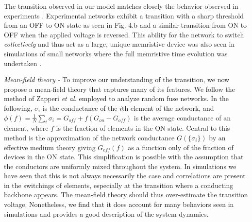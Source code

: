 \documentclass[aps,prl,reprint,groupedaddress]{revtex4-1}
\begin{document}
The transition observed in our model 
matches closely the behavior observed  in experiments .  Experimental networks exhibit a transition with a sharp
threshold from an OFF to ON state as seen in  \cite{Stieg2014} Fig. 4.b and a
similar transition from ON to OFF when the applied voltage is reversed.
This ability for the network to switch {\it collectively} and thus act as a large, unique 
memristive device was also seen in simulations of small networks where the full memristive time
evolution was undertaken \cite{NedaaeeOskoee2011, Sillin2014}.

{\it Mean-field theory -}  To improve our understanding of the transition, we now
propose a mean-field theory that captures many of its features. We follow the method of Zapperi {\it et al.}
\cite{Zapperi1999} employed to analyze random fuse networks.  In the following,
$\sigma_i$ is the conductance of the $i$th element of the network,
and \(\phi(f) = \frac{1}{N}\sum_i \sigma_i = G_{off} + f (G_{on} - G_{off})\)
is the average conductance of an element, where $f$ is the fraction of elements
in the ON state. Central to this method is the approximation of the network
conductance $G(\{\sigma_i\})$ by an effective medium theory giving $G_{eff}(f)$
as a function only of the fraction of devices in the ON state.  This
simplification is possible with the assumption that the conductors are
uniformly mixed throughout the system. In simulations we have seen
that this is not always necessarily the case and correlations are present in the switchings of
elements, especially at the transition where a conducting backbone appears.
The mean-field theory should thus over-estimate the transition voltage. Nonetheless, 
we find that it does account for many behaviors seen in simulations and
provides a good description of the system dynamics.
\end{document}
